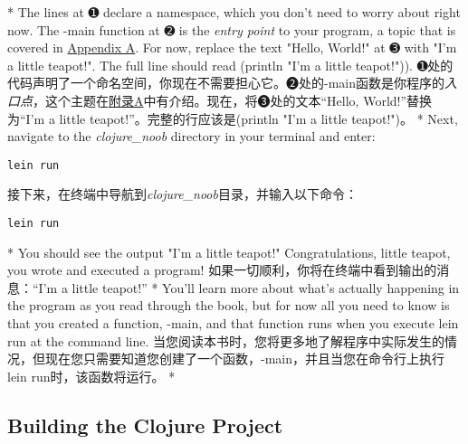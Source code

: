 \begin{paracol}{2}
\switchcolumn[0]*
The lines at ➊ declare a namespace, which you don't need to worry about
right now. The -main function at ➋ is the \emph{entry point} to your
program, a topic that is covered in \href{javascript:void(0)}{Appendix
A}. For now, replace the text "Hello, World!" at ➌ with "I'm a little
teapot!". The full line should read (println "I'm a little teapot!")).
\switchcolumn
➊处的代码声明了一个命名空间，你现在不需要担心它。➋处的-main函数是你程序的\emph{入口点}，这个主题在\href{javascript:void(0)}{附录A}中有介绍。现在，将➌处的文本“Hello, World!”替换为“I'm a little teapot!”。完整的行应该是(println "I'm a little teapot!")。
\switchcolumn[0]*
Next, navigate to the \emph{clojure\_noob} directory in your terminal
and enter:
\begin{verbatim}
lein run
\end{verbatim}
\switchcolumn
接下来，在终端中导航到\emph{clojure\_noob}目录，并输入以下命令：
\begin{verbatim}
lein run
\end{verbatim}
\switchcolumn[0]*
You should see the output "I'm a little teapot!" Congratulations, little
teapot, you wrote and executed a program!
\switchcolumn
如果一切顺利，你将在终端中看到输出的消息：“I'm a little teapot!”
\switchcolumn[0]*
You'll learn more about what's actually happening in the program as you
read through the book, but for now all you need to know is that you
created a function, -main, and that function runs when you execute lein
run at the command line.
\switchcolumn
当您阅读本书时，您将更多地了解程序中实际发生的情况，但现在您只需要知道您创建了一个函数，-main，并且当您在命令行上执行lein run时，该函数将运行。
\switchcolumn[0]*
\subsection{Building the Clojure Project}
\switchcolumn

\end{paracol}
